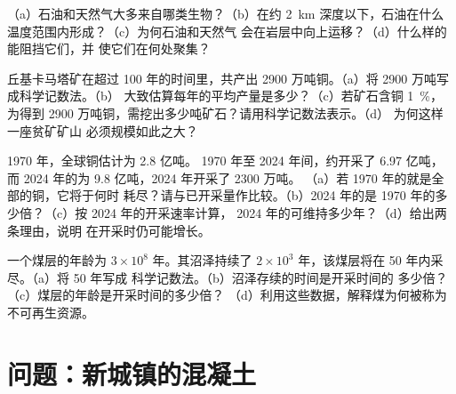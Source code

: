 \begin{exercise}[$\star\star$]\label{exo:g9:earth-resources:9}
（a）石油和天然气大多来自哪类生物？（b）在约
\qty{2}{km} 深度以下，石油在什么温度范围内形成？（c）为何石油和天然气
会在岩层中向上运移？（d）什么样的能阻挡它们，并
使它们在何处聚集？
\end{exercise}

\begin{exercise}[$\star\star$]\label{exo:g9:earth-resources:10}
丘基卡马塔矿在超过 100 年的时间里，共产出
2900 万吨铜。（a）将 2900 万吨写成科学记数法。（b）
大致估算每年的平均产量是多少？（c）若矿石含铜 \qty{1}{\%}，
为得到 2900 万吨铜，需挖出多少吨矿石？请用科学记数法表示。（d）
为何这样一座贫矿矿山
必须规模如此之大？
\end{exercise}

\begin{exercise}[$\star\star\star$]\label{exo:g9:earth-resources:11}
1970 年，全球铜估计为 2.8 亿吨。
1970 年至 2024 年间，约开采了 6.97 亿吨，而
2024 年的为 9.8 亿吨，2024 年开采了 2300 万吨。
（a）若 1970 年的就是全部的铜，它将于何时
耗尽？请与已开采量作比较。（b）2024 年的是
1970 年的多少倍？（c）按 2024 年的开采速率计算，
2024 年的可维持多少年？（d）给出两条理由，说明
在开采时仍可能增长。
\end{exercise}

\begin{exercise}[$\star\star\star$]\label{exo:g9:earth-resources:12}
一个煤层的年龄为 $3 \times 10^8$ 年。其沼泽持续了 $2 \times 10^3$
年，该煤层将在 50 年内采尽。（a）将 50 年写成
科学记数法。（b）沼泽存续的时间是开采时间的
多少倍？（c）煤层的年龄是开采时间的多少倍？
（d）利用这些数据，解释煤为何被称为
不可再生资源。
\end{exercise}

\section{问题：新城镇的混凝土}

